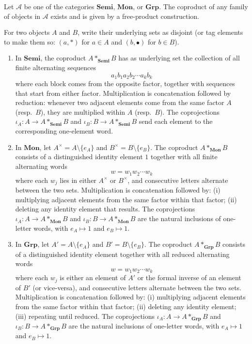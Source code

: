 \begin{proposition} \label{proposition:coproducts_of_semigroups_monoids_groups_as_free_products}
Let $\mathcal{A}$ be one of the categories $\mathbf{Semi}$, $\mathbf{Mon}$, or $\mathbf{Grp}$. The coproduct of any family of objects in $\mathcal{A}$ exists and is given by a free-product construction.

For two objects $A$ and $B$, write their underlying sets as disjoint (or tag elements to make them so: $(a, \ast)$ for $a \in A$ and $(b, \bullet)$ for $b \in B$).

\begin{enumerate}
    \item [\textbf{(Semi)}] In $\mathbf{Semi}$, the coproduct $A *_{\mathbf{Semi}} B$ has as underlying set the collection of all finite alternating sequences
    $$a_1 b_1 a_2 b_2 \cdots a_k b_k$$
    where each block comes from the opposite factor, together with sequences that start from either factor. Multiplication is concatenation followed by reduction: whenever two adjacent elements come from the same factor $A$ (resp.\ $B$), they are multiplied within $A$ (resp.\ $B$). The coprojections $\iota_A : A \to A *_{\mathbf{Semi}} B$ and $\iota_B : B \to A *_{\mathbf{Semi}} B$ send each element to the corresponding one-element word.

    \item [\textbf{(Mon)}] In $\mathbf{Mon}$, let $A^\times = A \setminus \{e_A\}$ and $B^\times = B \setminus \{e_B\}$. The coproduct $A *_{\mathbf{Mon}} B$ consists of a distinguished identity element $1$ together with all finite alternating words
    $$w = w_1 w_2 \cdots w_k$$
    where each $w_j$ lies in either $A^\times$ or $B^\times$, and consecutive letters alternate between the two sets. Multiplication is concatenation followed by: (i) multiplying adjacent elements from the same factor within that factor; (ii) deleting any identity element that results. The coprojections $\iota_A : A \to A *_{\mathbf{Mon}} B$ and $\iota_B : B \to A *_{\mathbf{Mon}} B$ are the natural inclusions of one-letter words, with $e_A \mapsto 1$ and $e_B \mapsto 1$.

    \item [\textbf{(Grp)}] In $\mathbf{Grp}$, let $A' = A \setminus \{e_A\}$ and $B' = B \setminus \{e_B\}$. The coproduct $A *_{\mathbf{Grp}} B$ consists of a distinguished identity element together with all reduced alternating words
    $$w = w_1 w_2 \cdots w_k$$
    where each $w_j$ is either an element of $A'$ or the formal inverse of an element of $B'$ (or vice-versa), and consecutive letters alternate between the two sets. Multiplication is concatenation followed by: (i) multiplying adjacent elements from the same factor within that factor; (ii) deleting any identity element; (iii) repeating until reduced. The coprojections $\iota_A : A \to A *_{\mathbf{Grp}} B$ and $\iota_B : B \to A *_{\mathbf{Grp}} B$ are the natural inclusions of one-letter words, with $e_A \mapsto 1$ and $e_B \mapsto 1$.
\end{enumerate}


\end{proposition}
